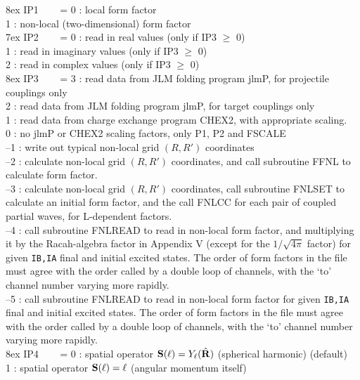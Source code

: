 \documentclass[11pt]{article}
\begin{document}
\hangindent 8ex  IP1
~~~  = 0 : local form factor
\\   1 : non-local (two-dimensional) form factor
\\


\hangindent 7ex  IP2
~~~  = 0 : read in real values      (only if IP3 $\geq$ 0)
\\   1 : read in imaginary values    (only if IP3 $\geq$ 0)
\\   2 : read in complex values        (only if IP3 $\geq$ 0)
\\


\hangindent 8ex  IP3
~~~  = 3 : read data from JLM folding program jlmP, for projectile couplings only
\\  2 : read data from JLM folding program jlmP, for target couplings only
\\   1 : read data from charge exchange program CHEX2, with appropriate scaling.
\\   0 : no jlmP or CHEX2 scaling factors, only P1, P2 and FSCALE
\\  --1 : write out typical non-local grid $(R,R')$ coordinates
\\  --2 : calculate non-local grid $(R,R')$ coordinates,
and call subroutine FFNL to calculate form factor.
\\  --3 : calculate non-local grid $(R,R')$ coordinates,
call subroutine FNLSET to calculate an initial form factor, and the call
FNLCC for each pair of coupled partial waves, for L-dependent factors.
\\ --4 : call subroutine FNLREAD to read in non-local form factor, and multiplying it by the Racah-algebra factor
in Appendix V (except for the $1/\sqrt{4\pi}$ factor) for given {\tt IB,IA} final and initial excited states. 
The order of form factors in the file must agree with the order called by a double loop of channels, with the `to' channel number varying more rapidly.
\\ --5 : call subroutine FNLREAD to read in non-local form factor for given {\tt IB,IA} final and initial excited states. 
The order of form factors in the file must agree with the order called by a double loop of channels, with the `to' channel number varying more rapidly.
\\
\hangindent 8ex IP4 
~~~  = 0 : spatial operator ${\bf S}(\ell) = Y_\ell (\hat{\bf R})$ (spherical harmonic)  (default)
\\  1 : spatial operator ${\bf S}(\ell) = {\bf \ell}$ (angular momentum itself) 
\\
\end{document}
